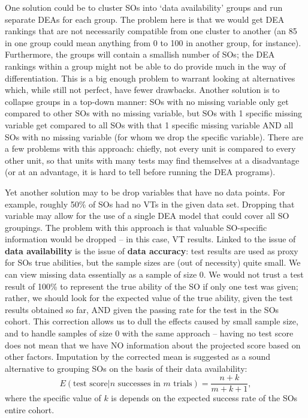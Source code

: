 One solution could be to cluster SOs into `data availability' groups and run separate DEAs for each group.  The problem here is that we would get DEA rankings that are not necessarily compatible from one cluster to another (an 85 in one group could mean anything from 0 to 100 in another group, for instance). Furthermore, the groups will  contain a smallish number of SOs; the DEA rankings within a group might not be able to do provide much in the way of differentiation. This is a big enough problem to warrant looking at alternatives which, while still not perfect, have fewer drawbacks. 
\newl Another solution is to collapse groups in a top-down manner: SOs with no missing variable only get compared to other SOs with no missing variable, but SOs with 1 specific missing variable get compared to all SOs with that 1 specific missing variable AND all SOs with no missing variable (for whom we drop the specific variable). There are a few problems with this approach: chiefly, not every unit is compared to every other unit, so that units with many tests may find themselves at a disadvantage (or at an advantage, it is hard to tell before running the DEA programs).  

Yet another solution may to be drop variables that have no data points.  For example, roughly 50\% of SOs had no VTs in the given data set.  Dropping that variable may allow for the use of a single DEA model that could cover all SO groupings.  The problem with this approach is that valuable SO-specific information would be dropped -- in this case, VT results.
\newpage\noindent Linked to the issue of \textbf{data availability} is the issue of \textbf{data accuracy}: test results are used as proxy for SOs true abilities, but the sample sizes are (out of necessity) quite small. We can view missing data essentially as a sample of size 0. We would not trust a test result of 100\% to represent the true ability of the SO if only one test was given; rather, we should look for the expected value of the true ability, given the test results obtained so far, AND given the passing rate for the test in the SOs cohort. This correction allows us to dull the effects caused by small sample size, and to handle samples of size 0 with the same approach -- having no test score does not mean that we have NO information about the projected score based on other factors. Imputation by the corrected mean is suggested as a sound alternative to grouping SOs on the basis of their data availability: $$E\left(\text{test score}|n \text{ successes in }m \text{ trials}\right)=\frac{n+k}{m+k+1}, $$ where the specific value of $k$ is depends on the expected success rate of the SOs entire cohort. 

